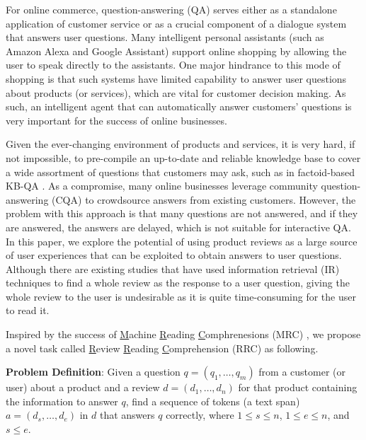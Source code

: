 For online commerce, question-answering (QA) serves either as a standalone application of customer service or as a crucial component of a dialogue system that answers user questions.
Many intelligent personal assistants (such as Amazon Alexa and Google Assistant) support online shopping by allowing the user to speak directly to the assistants. 
One major hindrance to this mode of shopping is that such systems have limited capability to answer user questions about products (or services), which are vital for customer decision making.
As such, an intelligent agent that can automatically answer customers' questions is very important for the success of online businesses.

Given the ever-changing environment of products and services, it is very hard, if not impossible, to pre-compile an up-to-date and reliable knowledge base to cover a wide assortment of questions that customers may ask, such as in factoid-based KB-QA \cite{xu2016question,fader2014open,kwok2001scaling,yin2015neural}.
As a compromise, many online businesses leverage community question-answering (CQA) \cite{mcauley2016addressing} to crowdsource answers from existing customers. However, the problem with this approach is that many questions are not answered, and if they are answered, the answers are delayed, which is not suitable for interactive QA.
In this paper, we explore the potential of using product reviews as a large source of user experiences that can be exploited to obtain answers to user questions. Although there are existing studies that have used information retrieval (IR) techniques \cite{mcauley2016addressing,yu2018aware} to find a whole review as the response to a user question, giving the whole review to the user is undesirable as it is quite time-consuming for the user to read it.

Inspired by the success of \underline{M}achine \underline{R}eading \underline{C}omphrenesions (MRC) \cite{rajpurkar2016squad,rajpurkar2018know}, we propose a novel task called \underline{R}eview \underline{R}eading \underline{C}omprehension (RRC) as following.

\textbf{Problem Definition}: Given a question $q=(q_1, \dots, q_m)$ from a customer (or user) about a product and a review $d=(d_1, \dots, d_n)$ for that product containing the information to answer $q$, find a sequence of tokens (a text span) $a=(d_s, \dots, d_e)$ in $d$ that answers $q$ correctly, where $1 \le s \le n$, $1\le e \le n$, and $s\le e$.

